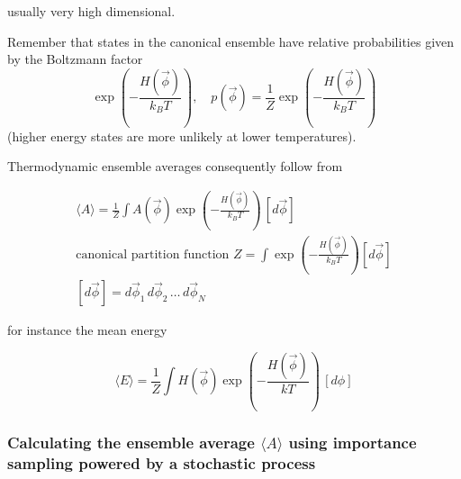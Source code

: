 usually very high dimensional.

Remember that states in the canonical ensemble have relative probabilities given 
by the Boltzmann factor
\begin{equation}
    \exp{\left( -\frac{H(\vec{\phi})}{k_B T} \right)}, \quad p(\vec{\phi}) = \frac{1}{Z} \exp{\left( -\frac{H(\vec{\phi})}{k_B T} \right)}
\end{equation}
(higher energy states are more unlikely at lower temperatures).

Thermodynamic ensemble averages consequently follow from

\begin{equation}
    \begin{gathered}
        \langle A \rangle = \frac{1}{Z} \int A(\vec{\phi}) \exp{\left( - \frac{H(\vec{\phi})}{k_BT}\right)} \, [d\vec{\phi}] \\
        \text{canonical partition function } Z = \int \exp{\left( -\frac{H(\vec{\phi})}{k_B T} \right)} [d\vec{\phi}] \\
        [d\vec{\phi}] = d\vec{\phi}_1 \, d\vec{\phi}_2 \, \dots \, d\vec{\phi}_N
    \end{gathered}
\end{equation}


for instance the mean energy

\begin{equation}
    \langle E \rangle = \frac{1}{Z} \int H(\vec{\phi}) \exp{\left( - \frac{H(\vec{\phi})}{kT}\right)} \, [d\phi]
\end{equation}


\subsubsection{Calculating the ensemble average $\langle A \rangle$ using importance sampling
powered by a stochastic process}

